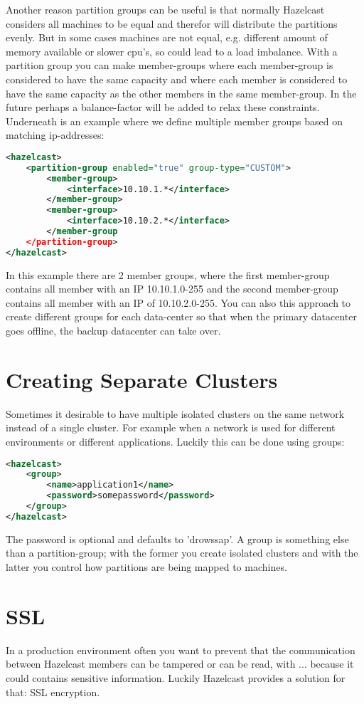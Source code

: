 Another reason partition groups can be useful is that normally Hazelcast considers all machines to be equal and therefor will distribute the partitions evenly. But in some cases machines are not equal, e.g. different amount of memory available or slower cpu's, so could lead to a load imbalance. With a partition group you can make member-groups where each member-group is considered to have the same capacity and where each member is considered to have the same capacity as the other members in the same member-group. In the future perhaps a balance-factor will be added to relax these constraints. Underneath is an example where we define multiple member groups based on matching ip-addresses:
\begin{lstlisting}[language=xml]
<hazelcast>
    <partition-group enabled="true" group-type="CUSTOM">
        <member-group>
            <interface>10.10.1.*</interface>
        </member-group>
        <member-group>
            <interface>10.10.2.*</interface>
        </member-group
    </partition-group>
</hazelcast>
\end{lstlisting}
In this example there are 2 member groups, where the first member-group contains all member with an IP 10.10.1.0-255 and the second member-group contains all member with an IP of 10.10.2.0-255. You can also this approach to create different groups for each data-center so that when the primary datacenter goes offline, the backup datacenter can take over.

\section{Creating Separate Clusters}
Sometimes it desirable to have multiple isolated clusters on the same network instead of a single cluster. For example when a network is used for different environments or different applications. Luckily this can be done using groups:
\begin{lstlisting}[language=xml]
<hazelcast>
    <group>
        <name>application1</name>
        <password>somepassword</password>
    </group>
</hazelcast>
\end{lstlisting}
The password is optional and defaults to 'drowssap'. A group is something else than a partition-group; with the former you create isolated clusters and with the latter you control how partitions are being mapped to machines.

\section{SSL}
In a production environment often you want to prevent that the communication between Hazelcast members can be tampered or can be read, with ... because it could contains sensitive information. Luckily Hazelcast provides a solution for that: SSL encryption.

